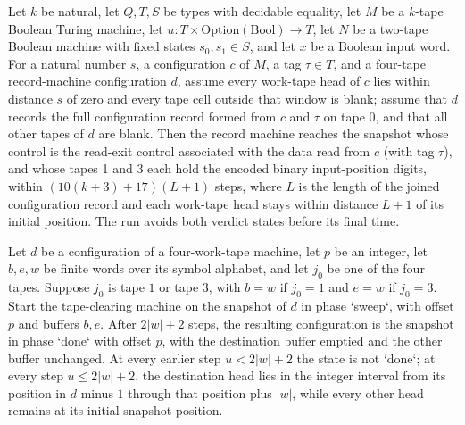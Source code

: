 \begin{theorem}
\label{Turing.recordStep_read_all}
\leanok
{}
Let $k$ be natural, let $Q,T,S$ be types with decidable equality, let $M$ be a $k$-tape
Boolean Turing machine, let $u:T\times\mathrm{Option}(\mathrm{Bool})\to T$, let $N$ be a
two-tape Boolean machine with fixed states $s_0,s_1\in S$, and let $x$ be a Boolean
input word. For a natural number $s$, a configuration $c$ of $M$, a tag $\tau\in T$, and
a four-tape record-machine configuration $d$, assume every work-tape head of $c$ lies
within distance $s$ of zero and every tape cell outside that window is blank; assume
that $d$ records the full configuration record formed from $c$ and $\tau$ on tape 0, and
that all other tapes of $d$ are blank. Then the record machine reaches the snapshot
whose control is the read-exit control associated with the data read from $c$ (with tag
$\tau$), and whose tapes 1 and 3 each hold the encoded binary input-position digits,
within $(10(k+3)+17)(L+1)$ steps, where $L$ is the length of the joined configuration
record and each work-tape head stays within distance $L+1$ of its initial position. The
run avoids both verdict states before its final time.
\end{theorem}

\begin{theorem}
\label{Turing.recordStep_clear_snapshot}
\leanok
{}
Let $d$ be a configuration of a four-work-tape machine, let $p$ be an integer, let
$b,e,w$ be finite words over its symbol alphabet, and let $j_0$ be one of the four
tapes. Suppose $j_0$ is tape $1$ or tape $3$, with $b=w$ if $j_0=1$ and $e=w$ if
$j_0=3$. Start the tape-clearing machine on the snapshot of $d$ in phase `sweep`, with
offset $p$ and buffers $b,e$. After $2|w|+2$ steps, the resulting configuration is the
snapshot in phase `done` with offset $p$, with the destination buffer emptied and the
other buffer unchanged. At every earlier step $u<2|w|+2$ the state is not `done`; at
every step $u\le 2|w|+2$, the destination head lies in the integer interval from its
position in $d$ minus $1$ through that position plus $|w|$, while every other head
remains at its initial snapshot position.
\end{theorem}

